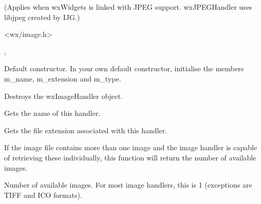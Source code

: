 (Applies when wxWidgets is linked with JPEG support. wxJPEGHandler uses libjpeg
created by IJG.)




<wx/image.h>


, 


\label{wximagehandlerconstr}


Default constructor. In your own default constructor, initialise the members
m\_name, m\_extension and m\_type.



Destroys the wxImageHandler object.



Gets the name of this handler.



Gets the file extension associated with this handler.

\label{wximagehandlergetimagecount}


If the image file contains more than one image and the image handler is capable 
of retrieving these individually, this function will return the number of
available images.



Number of available images. For most image handlers, this is 1 (exceptions
are TIFF and ICO formats).


